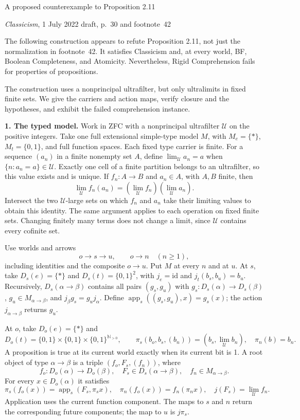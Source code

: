 \documentclass[12pt,leqno]{article}
\newcommand{\U}{\mathcal U}
\newcommand{\two}{\{0,1\}}
\begin{document}
\begin{center}
{\large A proposed counterexample to Proposition 2.11}\par
\small \emph{Classicism}, 1 July 2022 draft, p.~30 and footnote~42
\end{center}

The following construction appears to refute Proposition 2.11, not just
the normalization in footnote~42. It satisfies Classicism and, at every
world, BF, Boolean Completeness, and Atomicity. Nevertheless, Rigid
Comprehension fails for properties of propositions.

The construction uses a nonprincipal ultrafilter, but only ultralimits
in fixed finite sets. We give the carriers and action maps, verify
closure and the hypotheses, and exhibit the failed comprehension instance.

\medskip
\noindent\textbf{1. The typed model.}
Work in ZFC with a nonprincipal ultrafilter $\U$ on the positive integers.
Take one full extensional simple-type model $M$, with $M_e=\{*\}$,
$M_t=\two$, and full function spaces. Each fixed type carrier is finite.
For a sequence $(a_n)$ in a finite nonempty set $A$, define
$\lim_\U a_n=a$ when $\{n:a_n=a\}\in\U$. Exactly one cell of a finite
partition belongs to an ultrafilter, so this value exists and is unique.
If $f_n:A\to B$ and $a_n\in A$, with $A,B$ finite, then
\begin{equation}\label{eq:limit}
 \lim_\U f_n(a_n)=(\lim_\U f_n)(\lim_\U a_n).
\end{equation}
Intersect the two $\U$-large sets on which $f_n$ and $a_n$ take their
limiting values to obtain this identity. The same argument applies to
each operation on fixed finite sets. Changing finitely many terms does
not change a limit, since $\U$ contains every cofinite set.

Use worlds and arrows
\[
o\longrightarrow s\longrightarrow u,\qquad
o\longrightarrow n\quad(n\geq1),
\]
including identities and the composite $o\to u$. Put $M$ at every $n$
and at $u$. At $s$, take $D_s(e)=\{*\}$ and $D_s(t)=\two^2$, with
$j_e=\mathrm{id}$ and $j_t(b_s,b_u)=b_u$. Recursively, $D_s(\alpha\to\beta)$
contains all pairs $(g_s,g_u)$ with
$g_s:D_s(\alpha)\to D_s(\beta)$, $g_u\in M_{\alpha\to\beta}$, and
$j_\beta g_s=g_u j_\alpha$. Define
$\operatorname{app}_s((g_s,g_u),x)=g_s(x)$; the action
$j_{\alpha\to\beta}$ returns $g_u$.

At $o$, take $D_o(e)=\{*\}$ and
\[
 D_o(t)=\two\times\two\times\two^{\mathbb N_{>0}},\qquad
 \pi_s(b_o,b_s,(b_n))=(b_s,\lim_\U b_n),\quad \pi_n(b)=b_n.
\]
A proposition is true at its current world exactly when its current bit
is 1. A root object of type $\alpha\to\beta$ is a triple
$(f_o,F_s,(f_n))$, where
\[
 f_o:D_o(\alpha)\to D_o(\beta),\quad
 F_s\in D_s(\alpha\to\beta),\quad f_n\in M_{\alpha\to\beta}.
\]
For every $x\in D_o(\alpha)$ it satisfies
\[
 \pi_s(f_o(x))=\operatorname{app}_s(F_s,\pi_s x),\quad
 \pi_n(f_o(x))=f_n(\pi_n x),\quad j(F_s)=\lim_\U f_n.
\]
Application uses the current function component. The maps to $s$ and $n$
return the corresponding future components; the map to $u$ is $j\pi_s$.
\end{document}
